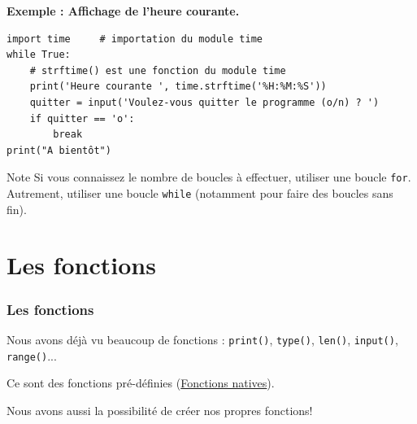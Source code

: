 \documentclass{beamer}
\begin{document}
\begin{frame}

\noindent\textbf{Exemple : Affichage de l'heure courante.}
\begin{verbatim}
import time     # importation du module time
while True:
    # strftime() est une fonction du module time
    print('Heure courante ', time.strftime('%H:%M:%S'))
    quitter = input('Voulez-vous quitter le programme (o/n) ? ')
    if quitter == 'o':
        break
print("A bientôt")
\end{verbatim}

\begin{block}{Note}
Si vous connaissez le nombre de boucles à effectuer, utiliser une boucle \texttt{for}.
Autrement, utiliser une boucle \texttt{while} (notamment pour faire des boucles sans fin).
\end{block}
\end{frame}

\section{Les fonctions}

\begin{frame}
\frametitle{Les fonctions}


Nous avons déjà vu beaucoup de fonctions : \texttt{print()}, \texttt{type()}, \texttt{len()}, \texttt{input()}, \texttt{range()}...

Ce sont des fonctions pré-définies (\href{{https://docs.python.org/fr/3/library/functions.html}}{Fonctions natives}).

Nous avons aussi la possibilité de créer nos propres fonctions!


\end{frame}
\end{document}
